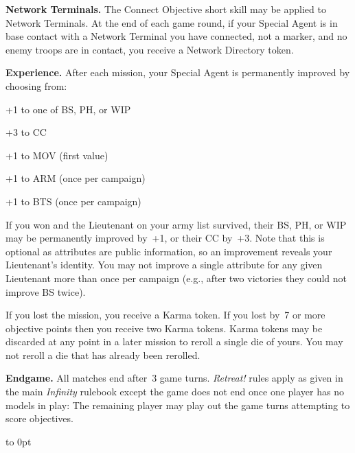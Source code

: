 \documentclass{tokh}
\newcommand{\missionrule}[1]{\noindent\textbf{#1}\xspace}
\begin{document}
\medskip%
\missionrule{Network Terminals.}  The Connect Objective short skill
may be applied to Network Terminals.  At the end of each game round,
if your Special Agent is in base contact with a Network Terminal you
have connected, not a marker, and no enemy troops are in contact, you
receive a Network Directory token.

\missionrule{Experience.}  After each mission, your Special Agent is
permanently improved by choosing from:

\begin{squishitemize}
\item +1 to one of BS, PH, or WIP
\item +3 to CC
\item +1 to MOV (first value)
\item +1 to ARM (once per campaign)
\item +1 to BTS (once per campaign)
\end{squishitemize}

If you won and the Lieutenant on your army list survived, their BS,
PH, or WIP may be permanently improved by~+1, or their CC by~+3.  Note
that this is optional as attributes are public information, so an
improvement reveals your Lieutenant's identity.  You may not improve a
single attribute for any given Lieutenant more than once per campaign
(e.g., after two victories they could not improve BS twice).
  
If you lost the mission, you receive a Karma token.  If you lost by~7
or more objective points then you receive two Karma tokens.  Karma
tokens may be discarded at any point in a later mission to reroll a
single die of yours.  You may not reroll a die that has already been
rerolled.

\missionrule{Endgame.}  All matches end after~3 game turns.
\emph{Retreat!} rules apply as given in the main \emph{Infinity}
rulebook except the game does not end once one player has no models in
play: The remaining player may play out the game turns attempting to
score objectives.

\vfill
\vbox to 0pt{}









\end{document}
